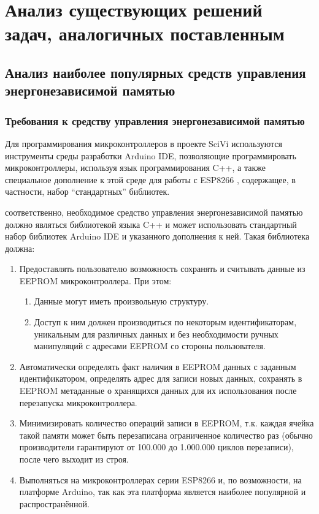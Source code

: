 \chapter{Анализ существующих решений задач, аналогичных поставленным}

\section{Анализ наиболее популярных средств управления энергонезависимой памятью}

\subsection{Требования к средству управления энергонезависимой памятью} \label{subsection:requirements}

Для программирования микроконтроллеров в проекте SciVi используются инструменты среды разработки Arduino IDE, позволяющие программировать микроконтроллеры, используя язык программирования C++, а также специальное дополнение к этой среде для работы с ESP8266 \cite{web:esp-core}, содержащее, в частности, набор "`стандартных"' библиотек.

соответственно, необходимое средство управления энергонезависимой памятью должно являться библиотекой языка C++ и может использовать стандартный набор библиотек Arduino IDE и указанного дополнения к ней.
Такая библиотека должна:
\begin{enumerate}
	\item Предоставлять пользователю возможность сохранять и считывать данные из EEPROM микроконтроллера. При этом:
	\begin{enumerate}
		\item Данные могут иметь произвольную структуру.
		\item Доступ к ним должен производиться по некоторым  идентификаторам, уникальным для различных данных и без необходимости ручных манипуляций с адресами EEPROM со стороны пользователя.
	\end{enumerate}
	\item Автоматически определять факт наличия в EEPROM данных с заданным идентификатором, определять адрес для записи новых данных, сохранять в EEPROM метаданные о хранящихся данных для их использования после перезапуска микроконтроллера.
	\item Минимизировать количество операций записи в EEPROM, т.к. каждая ячейка такой памяти может быть перезаписана ограниченное количество раз (обычно производители гарантируют от 100.000 до 1.000.000 циклов перезаписи), после чего выходит из строя.
	\item Выполняться на микроконтроллерах серии ESP8266 и, по возможности, на платформе Arduino, так как эта платформа является наиболее популярной и распространённой.
\end{enumerate}


